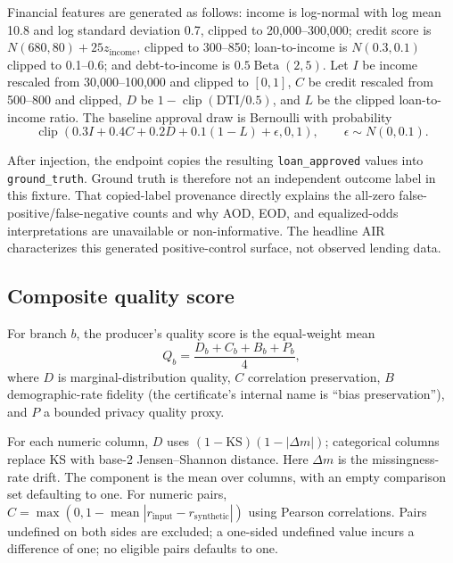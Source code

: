 Financial features are generated as follows: income is log-normal with log mean 10.8 and log
standard deviation 0.7, clipped to 20,000--300,000; credit score is
$N(680,80)+25z_{\mathrm{income}}$, clipped to 300--850; loan-to-income is $N(0.3,0.1)$ clipped to
0.1--0.6; and debt-to-income is $0.5\operatorname{Beta}(2,5)$. Let $I$ be income rescaled from
30,000--100,000 and clipped to $[0,1]$, $C$ be credit rescaled from 500--800 and clipped, $D$ be
$1-\operatorname{clip}(\mathrm{DTI}/0.5)$, and $L$ be the clipped loan-to-income ratio. The baseline
approval draw is Bernoulli with probability
\begin{equation}
  \operatorname{clip}\!\left(0.3I+0.4C+0.2D+0.1(1-L)+\epsilon,0,1\right),
  \qquad \epsilon\sim N(0,0.1).
\end{equation}

After injection, the endpoint copies the resulting \texttt{loan\_approved} values into
\texttt{ground\_truth}. Ground truth is therefore not an independent outcome label in this fixture.
That copied-label provenance directly explains the all-zero false-positive/false-negative counts
and why AOD, EOD, and equalized-odds interpretations are unavailable or non-informative. The
headline AIR characterizes this generated positive-control surface, not observed lending data.

\subsection{Composite quality score}

For branch $b$, the producer's quality score is the equal-weight mean
\begin{equation}
  Q_b=\frac{D_b+C_b+B_b+P_b}{4},
\end{equation}
where $D$ is marginal-distribution quality, $C$ correlation preservation, $B$ demographic-rate
fidelity (the certificate's internal name is ``bias preservation''), and $P$ a bounded privacy
quality proxy.

For each numeric column, $D$ uses $(1-\mathrm{KS})(1-|\Delta m|)$; categorical columns replace KS
with base-2 Jensen--Shannon distance. Here $\Delta m$ is the missingness-rate drift. The component is
the mean over columns, with an empty comparison set defaulting to one. For numeric pairs,
$C=\max(0,1-\operatorname{mean}|r_{\mathrm{input}}-r_{\mathrm{synthetic}}|)$ using Pearson
correlations. Pairs undefined on both sides are excluded; a one-sided undefined value incurs a
difference of one; no eligible pairs defaults to one.

